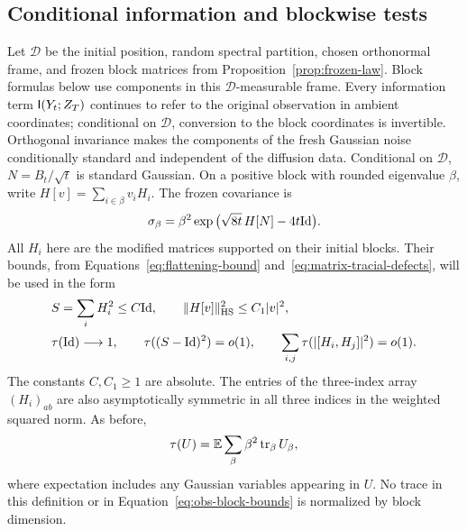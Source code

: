 \subsection{Conditional information and blockwise tests}

Let $\mathcal D$ be the initial position, random spectral partition,
chosen orthonormal frame, and frozen block matrices from
Proposition~\ref{prop:frozen-law}.  Block formulas below use components
in this $\mathcal D$-measurable frame.  Every information term
$\mathsf I(Y_t;Z_T)$ continues to refer to the original observation in
ambient coordinates; conditional on $\mathcal D$, conversion to
the block coordinates is invertible.  Orthogonal invariance makes
the components of the fresh Gaussian noise conditionally standard
and independent of the diffusion data.  Conditional on $\mathcal D$,
$N=B_t/\sqrt t$ is standard Gaussian.  On a positive block with
rounded eigenvalue $\beta$, write $H[v]=\sum_{i\in\beta}v_iH_i$.
The frozen covariance is
\begin{equation}\label{eq:obs-frozen-covariance}
 \sigma_\beta=\beta^2
       \exp\big(\sqrt{8t}\,H[N]-4t\mathrm{Id}\big).
\end{equation}
All $H_i$ here are the modified matrices supported on their initial
blocks.  Their bounds, from
Equations~\eqref{eq:flattening-bound} and~\eqref{eq:matrix-tracial-defects},
will be used in the form
\begin{align}
 &S=\sum_iH_i^2\le C\mathrm{Id},
 \qquad \|H[v]\|_{\mathrm{HS}}^2\le C_1|v|^2,
 \label{eq:obs-block-bounds}\\
 &\tau(\mathrm{Id})\longrightarrow1,
 \qquad\tau((S-\mathrm{Id})^2)=o(1),
 \qquad\sum_{i,j}\tau(|[H_i,H_j]|^2)=o(1).
 \label{eq:obs-block-defects}
\end{align}
The constants $C,C_1\ge1$ are absolute.  The entries of the three-index
array $(H_i)_{ab}$ are also asymptotically symmetric in all three
indices in the weighted squared norm.  As before,
\[
 \tau(U)=\mathbb E\sum_\beta\beta^2\operatorname{tr}_\beta U_\beta,
\]
where expectation includes any Gaussian variables appearing in $U$.
No trace in this definition or in
Equation~\eqref{eq:obs-block-bounds} is normalized by block dimension.

